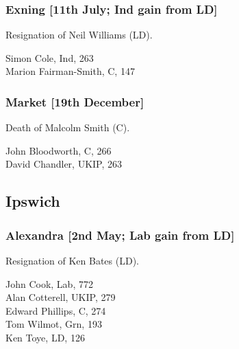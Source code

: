 \documentclass[a4paper,openany,10pt]{book}
\begin{document}
\subsubsection*{Exning \hspace*{\fill}\nolinebreak[1]%
\enspace\hspace*{\fill}
[11th July; Ind gain from LD]}


Resignation of Neil Williams (LD).



Simon Cole, Ind, 263\\
Marion Fairman-Smith, C, 147\\


\subsubsection*{Market \hspace*{\fill}\nolinebreak[1]%
\enspace\hspace*{\fill}
[19th December]}


Death of Malcolm Smith (C).



John Bloodworth, C, 266\\
David Chandler, UKIP, 263\\


\subsection*{Ipswich}

\subsubsection*{Alexandra \hspace*{\fill}\nolinebreak[1]%
\enspace\hspace*{\fill}
[2nd May; Lab gain from LD]}


Resignation of Ken Bates (LD).



John Cook, Lab, 772\\
Alan Cotterell, UKIP, 279\\
Edward Phillips, C, 274\\
Tom Wilmot, Grn, 193\\
Ken Toye, LD, 126\\
\end{document}

